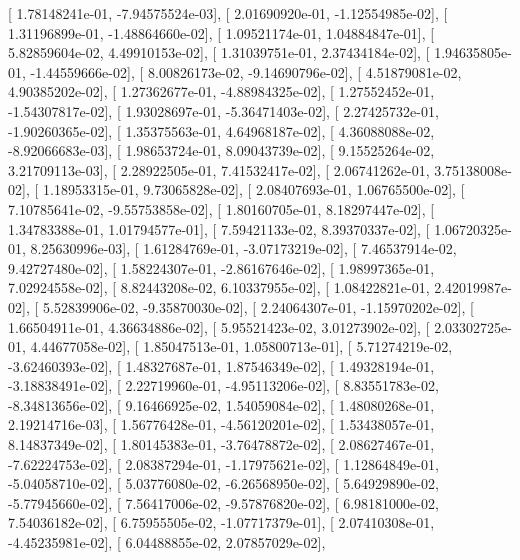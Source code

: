 \documentclass{article}
\begin{document}
       [  1.78148241e-01,  -7.94575524e-03],
       [  2.01690920e-01,  -1.12554985e-02],
       [  1.31196899e-01,  -1.48864660e-02],
       [  1.09521174e-01,   1.04884847e-01],
       [  5.82859604e-02,   4.49910153e-02],
       [  1.31039751e-01,   2.37434184e-02],
       [  1.94635805e-01,  -1.44559666e-02],
       [  8.00826173e-02,  -9.14690796e-02],
       [  4.51879081e-02,   4.90385202e-02],
       [  1.27362677e-01,  -4.88984325e-02],
       [  1.27552452e-01,  -1.54307817e-02],
       [  1.93028697e-01,  -5.36471403e-02],
       [  2.27425732e-01,  -1.90260365e-02],
       [  1.35375563e-01,   4.64968187e-02],
       [  4.36088088e-02,  -8.92066683e-03],
       [  1.98653724e-01,   8.09043739e-02],
       [  9.15525264e-02,   3.21709113e-03],
       [  2.28922505e-01,   7.41532417e-02],
       [  2.06741262e-01,   3.75138008e-02],
       [  1.18953315e-01,   9.73065828e-02],
       [  2.08407693e-01,   1.06765500e-02],
       [  7.10785641e-02,  -9.55753858e-02],
       [  1.80160705e-01,   8.18297447e-02],
       [  1.34783388e-01,   1.01794577e-01],
       [  7.59421133e-02,   8.39370337e-02],
       [  1.06720325e-01,   8.25630996e-03],
       [  1.61284769e-01,  -3.07173219e-02],
       [  7.46537914e-02,   9.42727480e-02],
       [  1.58224307e-01,  -2.86167646e-02],
       [  1.98997365e-01,   7.02924558e-02],
       [  8.82443208e-02,   6.10337955e-02],
       [  1.08422821e-01,   2.42019987e-02],
       [  5.52839906e-02,  -9.35870030e-02],
       [  2.24064307e-01,  -1.15970202e-02],
       [  1.66504911e-01,   4.36634886e-02],
       [  5.95521423e-02,   3.01273902e-02],
       [  2.03302725e-01,   4.44677058e-02],
       [  1.85047513e-01,   1.05800713e-01],
       [  5.71274219e-02,  -3.62460393e-02],
       [  1.48327687e-01,   1.87546349e-02],
       [  1.49328194e-01,  -3.18838491e-02],
       [  2.22719960e-01,  -4.95113206e-02],
       [  8.83551783e-02,  -8.34813656e-02],
       [  9.16466925e-02,   1.54059084e-02],
       [  1.48080268e-01,   2.19214716e-03],
       [  1.56776428e-01,  -4.56120201e-02],
       [  1.53438057e-01,   8.14837349e-02],
       [  1.80145383e-01,  -3.76478872e-02],
       [  2.08627467e-01,  -7.62224753e-02],
       [  2.08387294e-01,  -1.17975621e-02],
       [  1.12864849e-01,  -5.04058710e-02],
       [  5.03776080e-02,  -6.26568950e-02],
       [  5.64929890e-02,  -5.77945660e-02],
       [  7.56417006e-02,  -9.57876820e-02],
       [  6.98181000e-02,   7.54036182e-02],
       [  6.75955505e-02,  -1.07717379e-01],
       [  2.07410308e-01,  -4.45235981e-02],
       [  6.04488855e-02,   2.07857029e-02],
\end{document}
